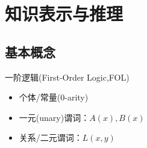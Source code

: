
\section{知识表示与推理}

\subsection{基本概念}
一阶逻辑(First-Order Logic,FOL)
\begin{itemize}
	\item 个体/常量(0-arity)
	\item 一元(unary)谓词：$A(x),B(x)$
	\item 关系/二元谓词：$L(x,y)$
\end{itemize}

